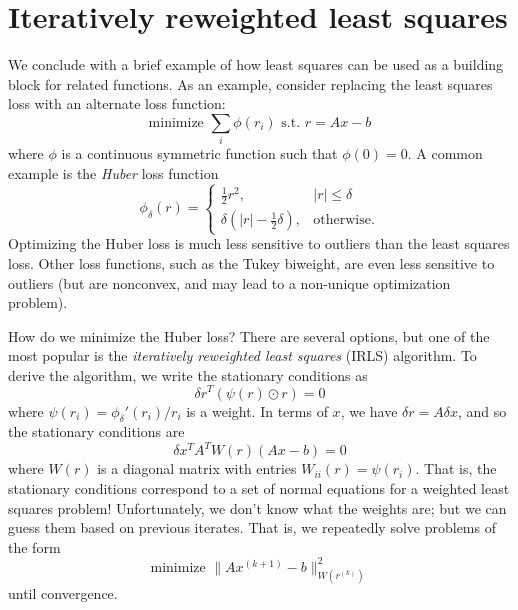 \documentclass[12pt, leqno]{article} %
\begin{document}
\section{Iteratively reweighted least squares}

We conclude with a brief example of how least squares can be used as a
building block for related functions.  As an example, consider
replacing the least squares loss with an alternate loss function:
\[
  \mbox{minimize } \sum_{i} \phi(r_i) \mbox{ s.t. } r = Ax-b
\]
where $\phi$ is a continuous symmetric function such that $\phi(0)=0$.
A common example is the {\em Huber} loss function
\[
  \phi_{\delta}(r) =
  \begin{cases}
    \frac{1}{2} r^2, & |r| \leq \delta \\
    \delta \left( |r|-\frac{1}{2}\delta \right), & \mbox{otherwise}.
  \end{cases}
\]
Optimizing the Huber loss is much less sensitive to outliers than the
least squares loss.  Other loss functions, such as the Tukey biweight,
are even less sensitive to outliers (but are nonconvex, and may lead
to a non-unique optimization problem).

How do we minimize the Huber loss?  There are several options, but one
of the most popular is the {\em iteratively reweighted least squares}
(IRLS) algorithm.  To derive the algorithm, we write the stationary
conditions as
\[
  \delta r^T (\psi(r) \odot r) = 0
\]
where $\psi(r_i) = \phi_{\delta}'(r_i)/r_i$ is a weight.  In terms of
$x$, we have $\delta r = A \delta x$, and so the stationary conditions
are
\[
  \delta x^T A^T W(r) (Ax-b) = 0
\]
where $W(r)$ is a diagonal matrix with entries $W_{ii}(r) = \psi(r_i)$.
That is, the stationary conditions correspond to a set of normal
equations for a weighted least squares problem!  Unfortunately, we
don't know what the weights are; but we can guess them based on
previous iterates.  That is, we repeatedly solve problems of the form
\[
  \mbox{minimize } \|Ax^{(k+1)}-b\|_{W(r^{(k)})}^2
\]
until convergence.
\end{document}
